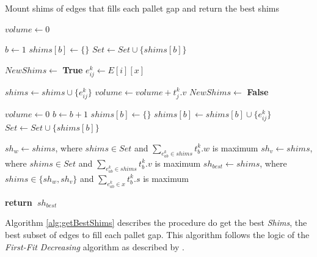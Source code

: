 \documentclass[preprint,authoryear]{elsarticle}
\renewcommand{\Return}{\State \bf {return}~}
\begin{document}
\begin{algorithm}[H]
	\caption{Mount shims of edges that fills each pallet gap and return the best shims}  \label{alg:getBestShims}
	\begin{algorithmic}[1]
		
		
		\State $volume \gets 0$	
		
		\State $b \gets 1$
		\State $shims[b] \gets \{\}$  \label{empty_shims}
		\State $Set \gets Set \cup \{shims[b]\}$ \label{empty_set}
		
		 \label{edges_indexes}
		
		
		\State $NewShims \gets$ {\bf True} \label{new_shims}
		\State $e_{ij}^k \gets E[i][x]$
		
		 \label{shims_set}
		
		
		
		\State $shims \gets shims \cup \{e_{ij}^k\}$
		\State $volume \gets volume + t_j^k.v$
		\State $NewShims \gets$ {\bf False} \label{new_shims_false}
		
		
		\EndIf
		
		\EndFor 
		
		 \label{new_shims2}
		\State $volume \gets 0$
		\State $b \gets b + 1$
		\State $shims[b] \gets \{\}$
		\State $shims[b] \gets shims[b] \cup \{e_{ij}^k\}$
		\State $Set \gets Set \cup \{shims[b]\}$
		\EndIf
		
		\EndFor 
		
		\State $sh_w \gets shims$, where $shims \in Set$ and $\sum_{e_{ab}^k \in shims} t_b^k.w$ is maximum  \label{best_weight}		
		\State $sh_v \gets shims$, where $shims \in Set$ and $\sum_{e_{ab}^k \in shims} t_b^k.v$ is maximum \label{best_volume}
		\State $sh_{best} \gets shims$, where $shims \in \{sh_w, sh_v\}$ and $\sum_{e_{ab}^k \in x} t_b^k.s$ is maximum \label{best_score}
		
		\Return $sh_{best}$
		
		\EndProcedure
		
	\end{algorithmic}
\end{algorithm}

Algorithm \ref{alg:getBestShims} describes the procedure do get the best {\it Shims}, the best subset of edges to fill each pallet gap. This algorithm follows the logic of the {\it First-Fit Decreasing} algorithm as described by \cite{JohnsonGarey1985}.
\end{document}
